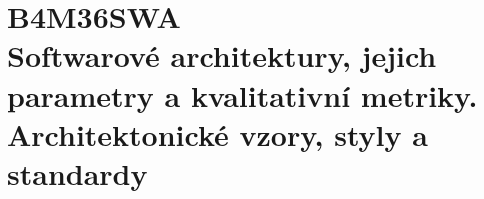 \chapter[Softwarové Architektury]{B4M36SWA \\[1ex]\Large{Softwarové architektury, jejich parametry a kvalitativní metriky. Architektonické vzory, styly a standardy}}
